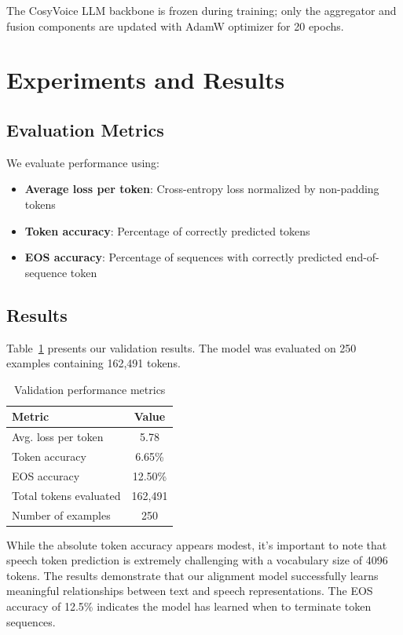 \documentclass[10pt,twocolumn,letterpaper]{article}
\begin{document}
The CosyVoice LLM backbone is frozen during training; only the aggregator and fusion components are updated with AdamW optimizer for 20 epochs.

\section{Experiments and Results}

\subsection{Evaluation Metrics}

We evaluate performance using:
\begin{itemize}
\item \textbf{Average loss per token}: Cross-entropy loss normalized by non-padding tokens
\item \textbf{Token accuracy}: Percentage of correctly predicted tokens
\item \textbf{EOS accuracy}: Percentage of sequences with correctly predicted end-of-sequence token
\end{itemize}

\subsection{Results}

Table~\ref{tab:results} presents our validation results. The model was evaluated on 250 examples containing 162,491 tokens.

\begin{table}[t]
\centering
\begin{tabular}{lc}
\toprule
\textbf{Metric} & \textbf{Value} \\
\midrule
Avg. loss per token & 5.78 \\
Token accuracy & 6.65\% \\
EOS accuracy & 12.50\% \\
Total tokens evaluated & 162,491 \\
Number of examples & 250 \\
\bottomrule
\end{tabular}
\caption{Validation performance metrics}
\label{tab:results}
\end{table}

While the absolute token accuracy appears modest, it's important to note that speech token prediction is extremely challenging with a vocabulary size of 4096 tokens. The results demonstrate that our alignment model successfully learns meaningful relationships between text and speech representations. The EOS accuracy of 12.5\% indicates the model has learned when to terminate token sequences.
\end{document}
